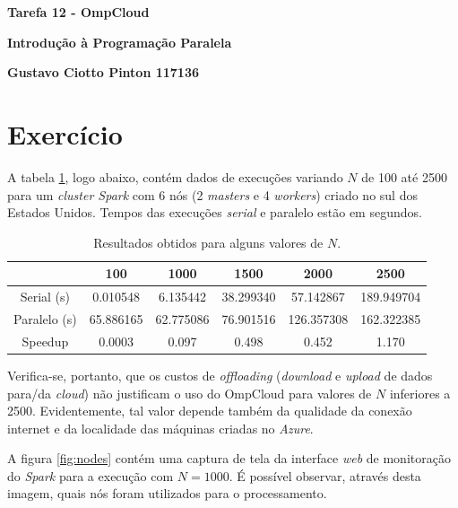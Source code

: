 \documentclass[12pt, a4paper]{article}
\begin{document}
{\large
\centerline{\textbf{Tarefa 12 - OmpCloud}}
\centerline{\textbf{Introdução à Programação Paralela}}
\centerline{\textbf{Gustavo Ciotto Pinton 117136}}
}

\section{Exercício}

A tabela \ref{tab:resultados}, logo abaixo, contém dados de execuções variando
\(N\) de 100 até 2500 para um \textit{cluster Spark} com 6 nós (2
\textit{masters} e 4 \textit{workers}) criado no sul dos Estados Unidos. Tempos
das execuções \textit{serial} e paralelo estão em segundos.

\begin{table}[h]
    \centering
	\caption{\label{tab:resultados} Resultados obtidos para alguns valores de \(N\).} 
	\begin{tabular}{| c | c | c | c | c | c | }
		\hline
		 & \textbf{100} & \textbf{1000} & \textbf{1500} & \textbf{2000} & \textbf{2500} \\ \hline 
		 Serial (s) & 0.010548 & 6.135442 & 38.299340 & 57.142867 & 189.949704 \\\hline 
		 Paralelo (s) & 65.886165 & 62.775086 & 76.901516 & 126.357308 & 162.322385 \\\hline 
		 Speedup & 0.0003 & 0.097  & 0.498  & 0.452 & 1.170 \\\hline
		
	\end{tabular}
\end{table}

Verifica-se, portanto, que os custos de \textit{offloading} (\textit{download}
e \textit{upload} de dados para/da \textit{cloud}) não justificam o uso do
OmpCloud para valores de \(N\) inferiores a 2500. Evidentemente, tal valor
depende também da qualidade da conexão internet e da localidade das máquinas
criadas no \textit{Azure}.

\vspace{12pt}

A figura \ref{fig:nodes} contém uma captura de tela da interface \textit{web} de
monitoração do \textit{Spark} para a execução com \(N=1000\). É possível
observar, através desta imagem, quais nós foram utilizados para o processamento.
\end{document}
